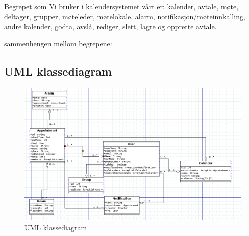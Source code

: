 Begrepet som Vi bruker i kalendersystemet vårt er:
kalender, avtale, møte, deltager, grupper, møteleder, møtelokale, alarm, notifikasjon/møteinnkalling, andre kalender, godta, avslå, rediger, slett, lagre og opprette avtale.

sammenhengen mellom begrepene:


\newpage

\subsection{UML klassediagram}
\begin{figure}[ht!]
\includegraphics[width=150mm]{UML.png}
\caption{UML klassediagram}
\end{figure}